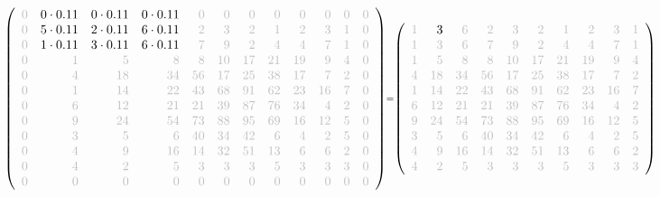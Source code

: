 \documentclass[11pt]{article}
\begin{document}
    
    \[\scriptstyle \def\g{\color{lightgray}}\left(\begin{array}{rrrrrrrrrrrr}\g{0} & 0\cdot 0.11 & 0\cdot 0.11 & 0\cdot 0.11 & \g{0} & \g{0} & \g{0} & \g{0} & \g{0} & \g{0} & \g{0} & \g{0}\\\g{0} & 5\cdot 0.11 & 2\cdot 0.11 & 6\cdot 0.11 & \g{2} & \g{3} & \g{2} & \g{1} & \g{2} & \g{3} & \g{1} & \g{0}\\\g{0} & 1\cdot 0.11 & 3\cdot 0.11 & 6\cdot 0.11 & \g{7} & \g{9} & \g{2} & \g{4} & \g{4} & \g{7} & \g{1} & \g{0}\\\g{0} & \g{1} & \g{5} & \g{8} & \g{8} & \g{10} & \g{17} & \g{21} & \g{19} & \g{9} & \g{4} & \g{0}\\\g{0} & \g{4} & \g{18} & \g{34} & \g{56} & \g{17} & \g{25} & \g{38} & \g{17} & \g{7} & \g{2} & \g{0}\\\g{0} & \g{1} & \g{14} & \g{22} & \g{43} & \g{68} & \g{91} & \g{62} & \g{23} & \g{16} & \g{7} & \g{0}\\\g{0} & \g{6} & \g{12} & \g{21} & \g{21} & \g{39} & \g{87} & \g{76} & \g{34} & \g{4} & \g{2} & \g{0}\\\g{0} & \g{9} & \g{24} & \g{54} & \g{73} & \g{88} & \g{95} & \g{69} & \g{16} & \g{12} & \g{5} & \g{0}\\\g{0} & \g{3} & \g{5} & \g{6} & \g{40} & \g{34} & \g{42} & \g{6} & \g{4} & \g{2} & \g{5} & \g{0}\\\g{0} & \g{4} & \g{9} & \g{16} & \g{14} & \g{32} & \g{51} & \g{13} & \g{6} & \g{6} & \g{2} & \g{0}\\\g{0} & \g{4} & \g{2} & \g{5} & \g{3} & \g{3} & \g{3} & \g{5} & \g{3} & \g{3} & \g{3} & \g{0}\\\g{0} & \g{0} & \g{0} & \g{0} & \g{0} & \g{0} & \g{0} & \g{0} & \g{0} & \g{0} & \g{0} & \g{0}\end{array}\right)=\left(\begin{array}{rrrrrrrrrrrr}\g{1} & 3 & \g{6} & \g{2} & \g{3} & \g{2} & \g{1} & \g{2} & \g{3} & \g{1}\\\g{1} & \g{3} & \g{6} & \g{7} & \g{9} & \g{2} & \g{4} & \g{4} & \g{7} & \g{1}\\\g{1} & \g{5} & \g{8} & \g{8} & \g{10} & \g{17} & \g{21} & \g{19} & \g{9} & \g{4}\\\g{4} & \g{18} & \g{34} & \g{56} & \g{17} & \g{25} & \g{38} & \g{17} & \g{7} & \g{2}\\\g{1} & \g{14} & \g{22} & \g{43} & \g{68} & \g{91} & \g{62} & \g{23} & \g{16} & \g{7}\\\g{6} & \g{12} & \g{21} & \g{21} & \g{39} & \g{87} & \g{76} & \g{34} & \g{4} & \g{2}\\\g{9} & \g{24} & \g{54} & \g{73} & \g{88} & \g{95} & \g{69} & \g{16} & \g{12} & \g{5}\\\g{3} & \g{5} & \g{6} & \g{40} & \g{34} & \g{42} & \g{6} & \g{4} & \g{2} & \g{5}\\\g{4} & \g{9} & \g{16} & \g{14} & \g{32} & \g{51} & \g{13} & \g{6} & \g{6} & \g{2}\\\g{4} & \g{2} & \g{5} & \g{3} & \g{3} & \g{3} & \g{5} & \g{3} & \g{3} & \g{3}\end{array}\right)\]
\end{document}
